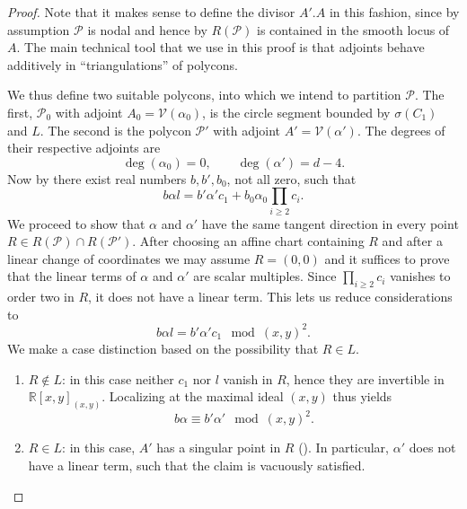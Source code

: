 \documentclass[a4paper,10pt]{amsart}
\theoremstyle{definition}
\theoremstyle{plain}
\newcommand{\cP}{{\mathcal P}}
\newcommand{\cV}{{\mathcal V}}
\newcommand{\R}{{\mathbb R}}
\begin{document}
\begin{proof}
 Note that it makes sense to define the divisor $A'.A$ in this fashion, since by assumption $\cP$ is nodal and hence by  $R(\cP)$ is contained in the smooth locus of $A$. The main technical tool that we use in this proof is that adjoints behave additively in ``triangulations'' of polycons.
 
 We thus define two suitable polycons, into which we intend to partition $\cP$. The first, $\cP_0$ with adjoint $A_0 = \cV(\alpha_0)$, is the circle segment bounded by $\sigma(C_1)$ and $L$. The second is the polycon $\cP'$ with adjoint $A' = \cV(\alpha')$. The degrees of their respective adjoints are
 \begin{equation*}
     \deg(\alpha_0) = 0, \qquad \deg(\alpha') = d - 4.
 \end{equation*}
 Now by \cite[Theorem 5.1]{Wachspress2016Adjoints} there exist real numbers $b, b', b_0$, not all zero, such that
 \begin{equation*}
     b\alpha l = b'\alpha'c_1 + b_0\alpha_0\prod_{i\geq2}c_i.
 \end{equation*}
 We proceed to show that $\alpha$ and $\alpha'$ have the same tangent direction in every point $R \in R(\cP) \cap R(\cP')$. After choosing an affine chart containing $R$ and after a linear change of coordinates we may assume $R = (0,0)$ and it suffices to prove that the linear terms of $\alpha$ and $\alpha'$ are scalar multiples. Since $\prod_{i\geq2} c_i$ vanishes to order two in $R$, it does not have a linear term. This lets us reduce considerations to
 \begin{equation} \label{eq:TangentCondition}
     b\alpha l = b'\alpha'c_1 \mod (x,y)^2.
 \end{equation}
 We make a case distinction based on the possibility that $R \in L$.
 \begin{enumerate}
     \item $R \not \in L$: in this case neither $c_1$ nor $l$ vanish in $R$, hence they are invertible in $\R[x,y]_{(x,y)}$. Localizing  at the maximal ideal $(x,y)$ thus yields
     \begin{equation*}
         b\alpha \equiv b'\alpha' \mod (x,y)^2.
     \end{equation*}

     \item $R \in L$: in this case, $A'$ has a singular point in $R$ (). In particular, $\alpha'$ does not have a linear term, such that the claim is vacuously satisfied. \qedhere
 \end{enumerate}
\end{proof}
\end{document}
